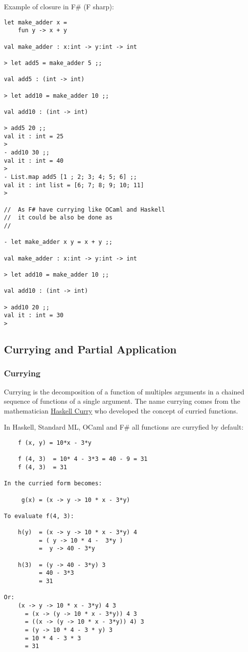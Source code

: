 \documentclass[11pt]{article}
\begin{document}
Example of closure in F\# (F sharp):

\begin{verbatim}
let make_adder x =
    fun y -> x + y 

val make_adder : x:int -> y:int -> int

> let add5 = make_adder 5 ;;

val add5 : (int -> int)

> let add10 = make_adder 10 ;;

val add10 : (int -> int)

> add5 20 ;;
val it : int = 25
> 
- add10 30 ;;
val it : int = 40
> 
- List.map add5 [1 ; 2; 3; 4; 5; 6] ;;
val it : int list = [6; 7; 8; 9; 10; 11]
> 

//  As F# have currying like OCaml and Haskell 
//  it could be also be done as 
//

- let make_adder x y = x + y ;;

val make_adder : x:int -> y:int -> int

> let add10 = make_adder 10 ;;

val add10 : (int -> int)

> add10 20 ;;
val it : int = 30
>
\end{verbatim}

\subsection{Currying and Partial Application}
\label{sec-1-6}
\subsubsection{Currying}
\label{sec-1-6-1}

Currying is the decomposition of a function of multiples arguments in
a chained sequence of functions of a single argument. The name
currying comes from the mathematician \href{https://en.wikipedia.org/wiki/Haskell_Curry}{Haskell Curry} who developed the
concept of curried functions.

In Haskell, Standard ML, OCaml and F\# all functions are curryfied by
default:

\begin{verbatim}
    f (x, y) = 10*x - 3*y   
    
    f (4, 3)  = 10* 4 - 3*3 = 40 - 9 = 31
    f (4, 3)  = 31
    
In the curried form becomes:

     g(x) = (x -> y -> 10 * x - 3*y)
     
To evaluate f(4, 3): 

    h(y)  = (x -> y -> 10 * x - 3*y) 4 
          = ( y -> 10 * 4 -  3*y )
          =  y -> 40 - 3*y
          
    h(3)  = (y -> 40 - 3*y) 3
          = 40 - 3*3
          = 31
          
Or:
    (x -> y -> 10 * x - 3*y) 4 3 
      = (x -> (y -> 10 * x - 3*y)) 4 3 
      = ((x -> (y -> 10 * x - 3*y)) 4) 3 
      = (y -> 10 * 4 - 3 * y) 3
      = 10 * 4 - 3 * 3 
      = 31
\end{verbatim}
\end{document}

